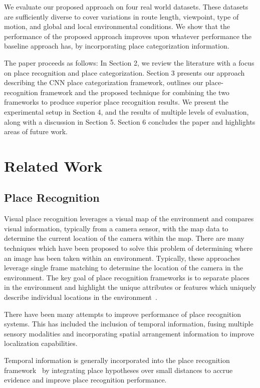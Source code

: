 \documentclass[letterpaper, 10 pt, conference]{ieeeconf}  %
\begin{document}
We evaluate our proposed approach on four real world datasets. These datasets are sufficiently diverse to cover variations in route length, viewpoint, type of motion, and global and local environmental conditions. We show that the performance of the proposed approach improves upon whatever performance the baseline approach has, by incorporating place categorization information. 

The paper proceeds as follows: In Section 2, we review the literature with a focus on place recognition and place categorization. Section 3 presents our approach describing the CNN place categorization framework, outlines our place-recognition framework and the proposed technique for combining the two frameworks to produce superior place recognition results. We present the experimental setup in Section 4, and the results of multiple levels of evaluation, along with a discussion in Section 5. Section 6 concludes the paper and highlights areas of future work.

\section{Related Work}

\subsection{Place Recognition}
Visual place recognition leverages a visual map of the environment and compares visual information, typically from a camera sensor, with the map data to determine the current location of the camera within the map. There are many techniques which have been proposed to solve this problem of determining where an image has been taken within an environment. Typically, these approaches leverage single frame matching to determine the location of the camera in the environment. The key goal of place recognition frameworks is to separate places in the environment and highlight the unique attributes or features which uniquely describe individual locations in the environment~\cite{Cummins2009}. 

There have been many attempts to improve performance of place recognition systems. This has included the inclusion of temporal information, fusing multiple sensory modalities and incorporating spatial arrangement information \cite{kejriwal2016high} to improve localization capabilities. 

Temporal information is generally incorporated into the place recognition framework~\cite{Milford2012} by integrating place hypotheses over small distances to accrue evidence and improve place recognition performance.
\end{document}
